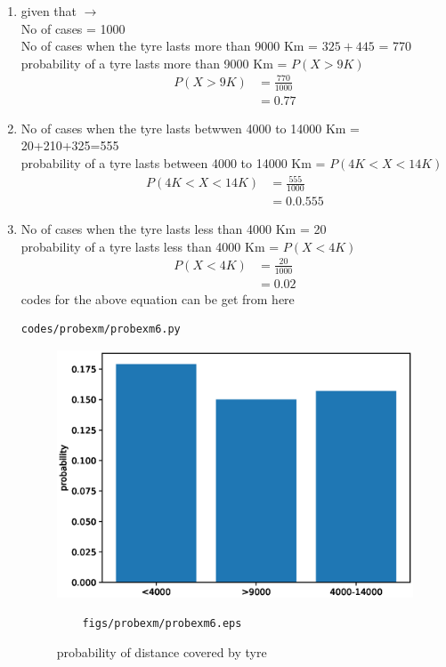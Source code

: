 \renewcommand{\theequation}{\theenumi}
\begin{enumerate}[label=\arabic*.,ref=\thesubsection.\theenumi]
\item given that $\to$
\\
No of cases = 1000
\\
No of cases when the tyre lasts more than 9000 Km = $325 +445$ = 770
\\
probability of a tyre lasts more than 9000  Km = $P(X>9K)$
\begin{align}
P\left(X>9K\right) &= \frac{770}{1000}
\\
&=0.77
\end{align}
\item No of cases when the tyre lasts betwwen  4000 to 14000 Km = 20+210+325=555
\\
probability of a tyre lasts between 4000 to 14000 Km = $P(4K<X<14K)$
\begin{align}
P\left(4K<X<14K\right) &= \frac{555}{1000}
\\
&=0.0.555
\end{align}
\item No of cases when the tyre lasts less than 4000 Km = 20
\\
probability of a tyre lasts less than 4000 Km = $P(X<4K)$
\begin{align}
P\left(X<4K\right) &= \frac{20}{1000}
\\
&=0.02
\end{align}
codes for the above equation can be get from here
\begin{lstlisting}
codes/probexm/probexm6.py
\end{lstlisting}
\begin{figure}[!ht]
	\centering
	\includegraphics[width=\columnwidth]{./figures/probexm/probexm6.eps}
	\caption{probability of distance covered by tyre }
	\label{fig:bt6}
	\begin{lstlisting}
	figs/probexm/probexm6.eps
	\end{lstlisting}
\end{figure}
\end{enumerate}